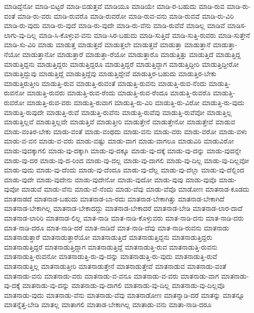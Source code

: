 {ಮಾಡಿದ್ದೆನೋ
ಮಾಡಿ-ಬಿಟ್ಟರೆ
ಮಾಡಿ-ಬಿಡುತ್ತವೆ
ಮಾಡಿಯೂ
ಮಾಡಿಯೇ
ಮಾಡಿ-ರ-ಬಹುದು
ಮಾಡಿ-ರುವ
ಮಾಡಿ-ರು-ವಂತೆ
ಮಾಡಿ-ರು-ವರು
ಮಾಡಿ-ರುವರೊ
ಮಾಡಿ-ರುವರೋ
ಮಾಡಿ-ರುವ-ವನು
ಮಾಡಿ-ರುವವೆ
ಮಾಡಿ-ರು-ವಿರಿ
ಮಾಡಿ-ರು-ವುದು
ಮಾಡಿ-ರು-ವುದೆ
ಮಾಡಿ-ರು-ವುದೇ
ಮಾಡಿ-ರು-ವೆನು
ಮಾಡಿ-ರುವೆವೆ
ಮಾಡಿಲ್ಲ
ಮಾಡಿವೆ
ಮಾಡಿಸ-ಲಾಗು-ವು-ದಿಲ್ಲ
ಮಾಡಿ-ಸಿ-ಕೊಳ್ಳುವ-ವನು
ಮಾಡಿ-ಸಿರ-ಬಹುದು
ಮಾಡಿ-ಸುತ್ತಿದೆ
ಮಾಡಿ-ಸುತ್ತಿ-ರುವರು
ಮಾಡಿ-ಸುತ್ತೇನೆ
ಮಾಡಿ-ಸು-ವಿರಿ
ಮಾಡು
ಮಾಡುತ್ತ
ಮಾಡುತ್ತದೆ
ಮಾಡುತ್ತಲೇ
ಮಾಡುತ್ತವೆ
ಮಾಡುತ್ತಾ
ಮಾಡುತ್ತಾನೆ
ಮಾಡುತ್ತಾ-ನೆಯೋ
ಮಾಡುತ್ತಾನೋ
ಮಾಡುತ್ತಾರೆ
ಮಾಡುತ್ತಾ-ರೆಯೋ
ಮಾಡುತ್ತಾರೊ
ಮಾಡುತ್ತಿತ್ತು
ಮಾಡುತ್ತಿದೆ
ಮಾಡುತ್ತಿದ್ದ
ಮಾಡುತ್ತಿದ್ದನು
ಮಾಡುತ್ತಿದ್ದರು
ಮಾಡುತ್ತಿದ್ದರೂ
ಮಾಡುತ್ತಿದ್ದರೆ
ಮಾಡುತ್ತಿದ್ದಾಗ
ಮಾಡುತ್ತಿದ್ದೀರಿ
ಮಾಡುತ್ತಿದ್ದೀರೋ
ಮಾಡುತ್ತಿದ್ದುವು
ಮಾಡುತ್ತಿದ್ದೆ
ಮಾಡುತ್ತಿದ್ದೆವು
ಮಾಡುತ್ತಿದ್ದೇವೆ
ಮಾಡುತ್ತಿರ-ಬಹುದು
ಮಾಡುತ್ತಿರ-ಬೇಕು
ಮಾಡುತ್ತಿರುತ್ತೀರಿ
ಮಾಡುತ್ತಿ-ರುವ
ಮಾಡುತ್ತಿ-ರುವಂತೆ
ಮಾಡುತ್ತಿ-ರುವನು
ಮಾಡುತ್ತಿ-ರುವ-ನೆಂದು
ಮಾಡುತ್ತಿ-ರುವನೋ
ಮಾಡುತ್ತಿ-ರುವರು
ಮಾಡುತ್ತಿ-ರುವ-ರೆಂದು
ಮಾಡುತ್ತಿ-ರುವ-ರೆಂದೂ
ಮಾಡುತ್ತಿ-ರುವರೊ
ಮಾಡುತ್ತಿ-ರುವರೋ
ಮಾಡುತ್ತಿ-ರುವ-ವರು
ಮಾಡುತ್ತಿ-ರುವಾಗ
ಮಾಡುತ್ತಿ-ರು-ವಿರಿ
ಮಾಡುತ್ತಿ-ರು-ವಿರೋ
ಮಾಡುತ್ತಿ-ರು-ವುದು
ಮಾಡುತ್ತಿ-ರುವುದೇ
ಮಾಡುತ್ತಿ-ರುವೆ
ಮಾಡುತ್ತಿ-ರುವೆನು
ಮಾಡುತ್ತಿ-ರುವೆವು
ಮಾಡುತ್ತಿ-ರುವೆವೋ
ಮಾಡುತ್ತಿಲ್ಲ
ಮಾಡುತ್ತಿಲ್ಲವೆ
ಮಾಡುತ್ತಿಲ್ಲವೇ
ಮಾಡುತ್ತಿವೆ
ಮಾಡುತ್ತೀರಿ
ಮಾಡುತ್ತೇನೆ
ಮಾಡುತ್ತೇನೋ
ಮಾಡುತ್ತೇವೆ
ಮಾಡುವ
ಮಾಡು-ವಂತಿರ-ಬೇಕು
ಮಾಡು-ವಂತೆ
ಮಾಡು-ವಂಥದು
ಮಾಡು-ವನು
ಮಾಡು-ವರು
ಮಾಡು-ವರೋ
ಮಾಡು-ವಳು
ಮಾಡು-ವ-ವನ
ಮಾಡು-ವ-ವರು
ಮಾಡು-ವಷ್ಟು
ಮಾಡು-ವಾಗ
ಮಾಡು-ವಾಗಲೂ
ಮಾಡುವಿರಿ
ಮಾಡುವಿರೋ
ಮಾಡು-ವುದಕ್ಕಾಗಲಿ
ಮಾಡು-ವು-ದಕ್ಕಾಗಿ
ಮಾಡು-ವು-ದಕ್ಕೂ
ಮಾಡು-ವು-ದಕ್ಕೆ
ಮಾಡು-ವು-ದನ್ನು
ಮಾಡು-ವುದನ್ನೇ
ಮಾಡು-ವು-ದರ
ಮಾಡು-ವು-ದ-ರಿಂದ
ಮಾಡು-ವು-ದಲ್ಲ
ಮಾಡು-ವು-ದಾಗಲಿ
ಮಾಡು-ವು-ದಿಲ್ಲ
ಮಾಡು-ವು-ದಿಲ್ಲವೋ
ಮಾಡು-ವುದು
ಮಾಡು-ವು-ದೆಂದು
ಮಾಡು-ವು-ದೆಂದೂ
ಮಾಡು-ವು-ದೆಲ್ಲ
ಮಾಡು-ವು-ದೆಲ್ಲಾ
ಮಾಡು-ವು-ದೆಲ್ಲಿಂದ
ಮಾಡು-ವುದೇ
ಮಾಡು-ವುದೇನು
ಮಾಡು-ವುದೇನೋ
ಮಾಡು-ವುದೋ
ಮಾಡು-ವುವು
ಮಾಡು-ವುವೊ
ಮಾಡು-ವುವೋ
ಮಾಡುವೆ
ಮಾಡು-ವೆನು
ಮಾಡು-ವೆ-ನೆಂದು
ಮಾಡು-ವೆವು
ಮಾಡು-ವೆವೊ
ಮಾಡೋಣ
ಮಾತನಾಡ-ಕೂಡದು
ಮಾತನಾಡದೆ
ಮಾತನಾಡ-ಬಹುದು
ಮಾತನಾಡ-ಬಾ-ರದು
ಮಾತನಾಡ-ಬೇಕಾಗಿತ್ತು
ಮಾತನಾಡ-ಬೇಕಾಗಿದೆ
ಮಾತನಾಡ-ಬೇಕಾಗಿಲ್ಲ
ಮಾತನಾಡ-ಬೇಕಾದದ್ದು
ಮಾತನಾಡ-ಬೇಕಾದರೆ
ಮಾತನಾಡ-ಬೇಡಿ
ಮಾತನಾಡ-ಲಾರ-ದಾದೆ
ಮಾತನಾಡ-ಲಾರಿರಿ
ಮಾತನಾಡ-ಲಿಲ್ಲ
ಮಾತ-ನಾಡಿ
ಮಾತ-ನಾಡಿ-ಕೊಳ್ಳುವರು
ಮಾತ-ನಾಡಿ-ದನು
ಮಾತ-ನಾಡಿ-ದರು
ಮಾತ-ನಾಡಿ-ದರೂ
ಮಾತ-ನಾಡಿ-ದರೆ
ಮಾತ-ನಾಡಿದೆ
ಮಾತ-ನಾಡಿ-ದೆವು
ಮಾತ-ನಾಡಿ-ರುವನು
ಮಾತನಾಡು
ಮಾತನಾಡುತ್ತಾರೆ
ಮಾತನಾಡುತ್ತಾರೆಯೋ
ಮಾತನಾಡುತ್ತಿದೆ
ಮಾತನಾಡುತ್ತಿದ್ದನು
ಮಾತನಾಡುತ್ತಿದ್ದರು
ಮಾತನಾಡುತ್ತಿದ್ದರೆ
ಮಾತನಾಡುತ್ತಿದ್ದಾಗ
ಮಾತನಾಡುತ್ತಿದ್ದೆ
ಮಾತನಾಡುತ್ತಿ-ರುವ
ಮಾತನಾಡುತ್ತಿ-ರುವನು
ಮಾತನಾಡುತ್ತಿ-ರುವನೋ
ಮಾತನಾಡುತ್ತಿ-ರು-ವು-ದನ್ನು
ಮಾತನಾಡುತ್ತಿ-ರು-ವುದು
ಮಾತನಾಡುತ್ತಿ-ರುವೆ
ಮಾತನಾಡುತ್ತಿಲ್ಲ
ಮಾತನಾಡುತ್ತೀರಿ
ಮಾತನಾಡುತ್ತೇನೆ
ಮಾತನಾಡುತ್ತೇವೆ
ಮಾತನಾಡುವ
ಮಾತನಾಡು-ವಂತೆ
ಮಾತನಾಡು-ವನು
ಮಾತನಾಡು-ವರು
ಮಾತನಾಡು-ವ-ವನೂ
ಮಾತನಾಡು-ವ-ವರು
ಮಾತನಾಡು-ವಾಗ
ಮಾತನಾಡು-ವು-ದಕ್ಕೆ
ಮಾತನಾಡು-ವು-ದನ್ನು
ಮಾತನಾಡು-ವು-ದಾಗಲಿ
ಮಾತನಾಡು-ವು-ದಿಲ್ಲ
ಮಾತನಾಡು-ವು-ದಿಲ್ಲವೊ
ಮಾತನಾಡು-ವುದು
ಮಾತನಾಡು-ವೆನು
ಮಾತನಾಡು-ವೆವು
ಮಾತನಾಡೋಣ
ಮಾತನ್ನಾಡಿ-ದರೆ
ಮಾತನ್ನು
ಮಾತನ್ನೂ
ಮಾತನ್ನೆತ್ತ-ಬೇಡಿ
ಮಾತಲ್ಲ
ಮಾತಾಗಲಿ
ಮಾತಾಡ-ಬೇಕಾಗಿಲ್ಲ
ಮಾತಾಡು-ವನು
ಮಾತಾ-ನಾಡಿ-ದರೂ
}
